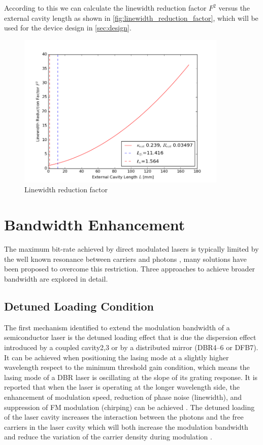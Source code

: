 According to this we can calculate the linewidth reduction factor $F^2$ versus the external cavity length as shown in \autoref{fig:linewidth_reduction_factor}, which will be used for the device design in \autoref{sec:design}.
\begin{figure}[ht]
    \centering
    \includegraphics[width=10cm]{figures/reduction_factor.png}
    \caption{Linewidth reduction factor}
    \label{fig:linewidth_reduction_factor}
\end{figure}

\section{Bandwidth Enhancement}\label{sec:bandwidth_enhancement}
The maximum bit-rate achieved by direct modulated lasers is typically limited by the well known resonance between carriers and photons \cite{coldren2012diode}, many solutions have been proposed to overcome this restriction. Three approaches to achieve broader bandwidth are explored in detail. 

\subsection{Detuned Loading Condition}\label{subsec:detuned_loading}
The first mechanism identified to extend the modulation bandwidth of a semiconductor laser is the detuned loading effect that is due the dispersion effect introduced by a coupled cavity2,3 or by a distributed mirror (DBR4–6 or DFB7). It can be achieved when positioning the lasing mode at a slightly higher wavelength respect to the minimum threshold gain condition, which means the lasing mode of a DBR laser is oscillating at the slope of its grating response. It is reported that when the laser is operating at the longer wavelength side, the enhancement of modulation speed, reduction of phase noise (linewidth), and suppression of FM modulation (chirping) can be achieved \cite{vahala1984detuned}.
The detuned loading of the laser cavity increases the interaction between the photons and the free carriers in the laser cavity \cite{vahala1984detuned} which will both increase the modulation bandwidth and reduce the variation of the carrier density during modulation \cite{kjebon2002experimental}. 

